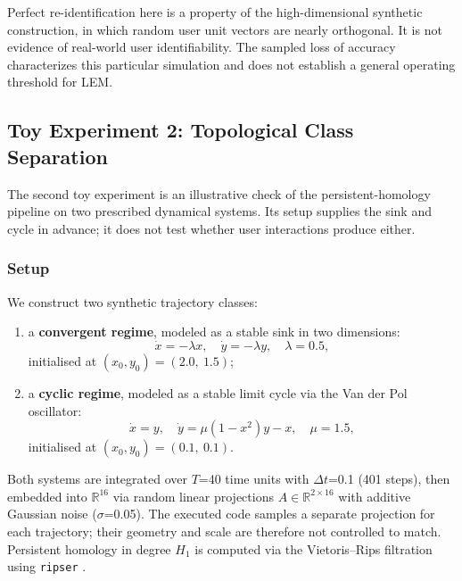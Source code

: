 \documentclass[11pt]{article}
\begin{document}
Perfect re-identification here is a property of the high-dimensional synthetic
construction, in which random user unit vectors are nearly orthogonal. It is
not evidence of real-world user identifiability. The sampled loss of accuracy
characterizes this particular simulation and does not establish a general
operating threshold for LEM.

\subsection{Toy Experiment 2: Topological Class Separation}

The second toy experiment is an illustrative check of the persistent-homology
pipeline on two prescribed dynamical systems. Its setup supplies the sink and
cycle in advance; it does not test whether user interactions produce either.

\subsubsection{Setup}

We construct two synthetic trajectory classes:

\begin{enumerate}[leftmargin=1.8em]
  \item a \textbf{convergent regime}, modeled as a stable sink in two dimensions:
        \begin{equation}
          \dot{x} = -\lambda x, \quad \dot{y} = -\lambda y, \quad \lambda = 0.5,
        \end{equation}
        initialised at $(x_0, y_0) = (2.0,\ 1.5)$;
  \item a \textbf{cyclic regime}, modeled as a stable limit cycle via the Van der Pol
        oscillator:
        \begin{equation}
          \dot{x} = y, \quad \dot{y} = \mu(1 - x^2)y - x, \quad \mu = 1.5,
        \end{equation}
        initialised at $(x_0, y_0) = (0.1,\ 0.1)$.
\end{enumerate}

Both systems are integrated over $T$=40 time units with $\Delta t$=0.1 (401 steps),
then embedded into $\mathbb{R}^{16}$ via random linear projections
$A \in \mathbb{R}^{2 \times 16}$ with additive Gaussian noise ($\sigma$=0.05).
The executed code samples a separate projection for each trajectory; their
geometry and scale are therefore not controlled to match.
Persistent homology in degree $H_1$ is computed via the Vietoris--Rips filtration
using \texttt{ripser} \cite{bauer2021ripser,tralie2018ripserpy}.
\end{document}
